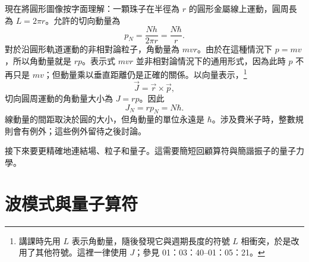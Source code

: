 \begin{classroomqa}
\end{classroomqa}

\begin{classroomqa}
\end{classroomqa}

\begin{classroomqa}
\end{classroomqa}

現在將圓形圖像按字面理解：一顆珠子在半徑為 \(r\) 的圓形金屬線上運動，圓周長為 \(L=2\pi r\)。允許的切向動量為
\begin{equation}
p_N=\frac{Nh}{2\pi r}=\frac{N\hbar}{r}.
\end{equation}
對於沿圓形軌道運動的非相對論粒子，角動量為 \(mvr\)。由於在這種情況下 \(p=mv\)，所以角動量就是 \(rp\)。表示式 \(mvr\) 並非相對論情況下的通用形式，因為此時 \(p\) 不再只是 \(mv\)；但動量乘以垂直距離仍是正確的關係。以向量表示，\footnote{講課時先用 \(L\) 表示角動量，隨後發現它與週期長度的符號 \(L\) 相衝突，於是改用了其他符號。這裡一律使用 \(J\)；參見 01：03：40--01：05：21。}
\begin{equation}
\vec J=\vec r\times\vec p,
\end{equation}
切向圓周運動的角動量大小為 \(J=rp\)。因此
\begin{equation}
J_N=rp_N=N\hbar.
\end{equation}
線動量的間距取決於圓的大小，但角動量的單位永遠是 \(\hbar\)。涉及費米子時，整數規則會有例外；這些例外留待之後討論。

接下來要更精確地連結場、粒子和量子。這需要簡短回顧算符與簡諧振子的量子力學。

\section{波模式與量子算符}

